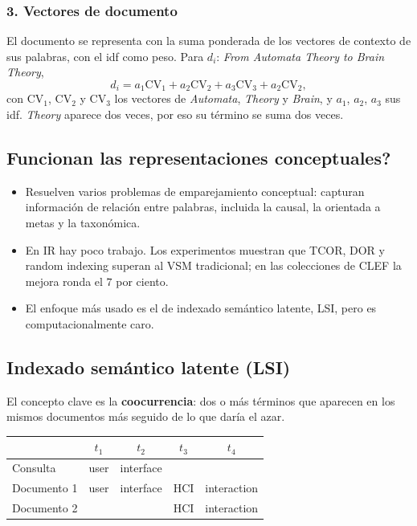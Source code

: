\documentclass[11pt,letterpaper]{article}
\begin{document}
\subsubsection*{3. Vectores de documento}

El documento se representa con la suma ponderada de los vectores de
contexto de sus palabras, con el idf como peso. Para
$d_i$: \textit{From Automata Theory to Brain Theory},
\[
    d_i = a_1 \mathrm{CV}_1 + a_2 \mathrm{CV}_2 + a_3 \mathrm{CV}_3
          + a_2 \mathrm{CV}_2 ,
\]
con $\mathrm{CV}_1$, $\mathrm{CV}_2$ y $\mathrm{CV}_3$ los vectores de
\textit{Automata}, \textit{Theory} y \textit{Brain}, y $a_1$, $a_2$,
$a_3$ sus idf. \textit{Theory} aparece dos veces, por eso su término
se suma dos veces.

\subsection*{Funcionan las representaciones conceptuales?}

\begin{itemize}[itemsep=0.3em]
    \item Resuelven varios problemas de emparejamiento conceptual:
          capturan información de relación entre palabras, incluida
          la causal, la orientada a metas y la taxonómica.
    \item En IR hay poco trabajo. Los experimentos muestran que TCOR,
          DOR y random indexing superan al VSM tradicional; en las
          colecciones de CLEF la mejora ronda el $7$ por ciento.
    \item El enfoque más usado es el de indexado semántico latente,
          LSI, pero es computacionalmente caro.
\end{itemize}

\subsection*{Indexado semántico latente (LSI)}

El concepto clave es la \textbf{coocurrencia}: dos o más términos que
aparecen en los mismos documentos más seguido de lo que daría el azar.

\begin{center}
\begin{tabular}{lcccc}
    \toprule
                & $t_1$ & $t_2$     & $t_3$ & $t_4$       \\
    \midrule
    Consulta    & user  & interface &       &             \\
    Documento 1 & user  & interface & HCI   & interaction \\
    Documento 2 &       &           & HCI   & interaction \\
    \bottomrule
\end{tabular}
\end{center}
\end{document}
